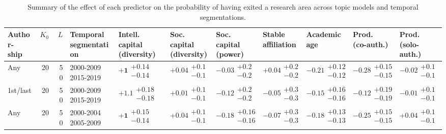\begin{table}[H]
\caption{Summary of the effect of each predictor on the probability of having exited a research area across topic models and temporal segmentations.}
\label{table:full_summary_exited}
\renewcommand{\arraystretch}{2}\fontsize{6}{7}\selectfont\begin{tabular}{lrrllllllll}
\toprule
\makecell{Author-\\ ship} & $K_0$ & $L$ & \makecell{Temporal \\ segmentation} & \makecell{Intell. capital \\ (diversity)} & \makecell{Soc. capital \\ (diversity)} & \makecell{Soc. capital \\ (power)} & \makecell{Stable \\ affiliation} & \makecell{Academic \\ age} & \makecell{Prod. \\ (co-auth.)} & \makecell{Prod. \\ (solo-auth.)} \\
\midrule
Any & 20 & 50 & \makecell{2000-2009 \\ 2015-2019} & $\bm{+1}\substack{+0.14 \\ -0.14}$ & $+0.04\substack{+0.1 \\ -0.1}$ & $-0.03\substack{+0.2 \\ -0.2}$ & $+0.04\substack{+0.2 \\ -0.2}$ & $\bm{-0.21}\substack{+0.12 \\ -0.12}$ & $\bm{-0.28}\substack{+0.15 \\ -0.15}$ & $-0.02\substack{+0.1 \\ -0.1}$ \\
1st/last & 20 & 50 & \makecell{2000-2009 \\ 2015-2019} & $\bm{+1.1}\substack{+0.18 \\ -0.18}$ & $+0.01\substack{+0.1 \\ -0.1}$ & $-0.12\substack{+0.2 \\ -0.2}$ & $-0.05\substack{+0.3 \\ -0.3}$ & $-0.15\substack{+0.16 \\ -0.16}$ & $-0.12\substack{+0.19 \\ -0.19}$ & $-0.01\substack{+0.1 \\ -0.1}$ \\
Any & 20 & 50 & \makecell{2000-2004 \\ 2005-2009} & $\bm{+1}\substack{+0.15 \\ -0.14}$ & $+0.04\substack{+0.1 \\ -0.1}$ & $\bm{-0.18}\substack{+0.16 \\ -0.16}$ & $-0.07\substack{+0.3 \\ -0.3}$ & $\bm{-0.18}\substack{+0.13 \\ -0.13}$ & $\bm{-0.25}\substack{+0.15 \\ -0.15}$ & $+0.04\substack{+0.1 \\ -0.1}$ \\

\end{tabular}
\end{table}
